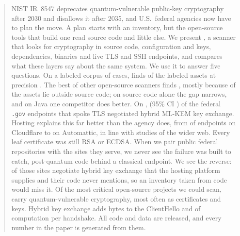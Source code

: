 \begin{abstract}
NIST IR~8547 deprecates quantum-vulnerable public-key cryptography after 2030
and disallows it after 2035, and U.S.\ federal agencies now have to plan the
move. A plan starts with an inventory, but the open-source tools that build one
read source code and little else. We present \tool{}, a scanner that looks for
cryptography in source code, configuration and keys, dependencies, binaries and
live TLS and SSH endpoints, and compares what these layers say about the same
system. We use it to answer five questions.
On a labeled corpus of  cases, \tool{} finds
 of the labeled assets at precision
. The best of  other
open-source scanners finds , mostly because
 of the assets lie outside source code; on source
code alone the gap narrows, and on Java one competitor does better.
On ,  (95\% CI ) of the
 federal \texttt{.gov} endpoints that spoke TLS
negotiated hybrid ML-KEM key exchange. Hosting explains this far better than
the agency does, from  of endpoints on Cloudflare to
 on Automattic, in line with studies of the wider
web. Every leaf certificate was still RSA or ECDSA.
When we pair  public federal repositories with the sites
they serve, we never see the failure \tool{} was built to catch, post-quantum
code behind a classical endpoint. We see the reverse:
 of those sites negotiate hybrid key exchange
that the hosting platform supplies and their code never mentions, so an
inventory taken from code would miss it.
Of the  most critical open-source projects we could scan,
 carry quantum-vulnerable cryptography, most often as
certificates and keys. Hybrid key exchange adds  bytes to
the ClientHello and  of computation per
handshake. All code and data are released, and every number in the paper is
generated from them.
\end{abstract}
